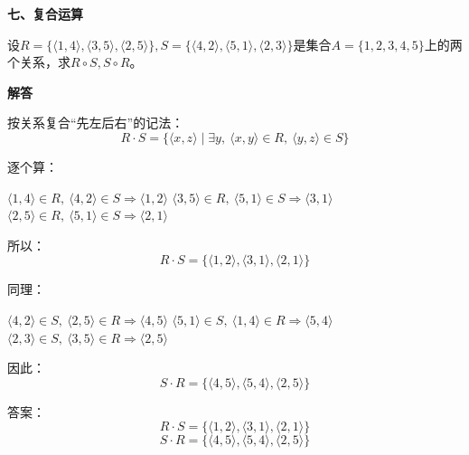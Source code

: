 \noindent\textbf{七、复合运算}

设$
R = \{\langle 1,4\rangle,\langle 3,5\rangle,\langle 2,5\rangle\},S = \{\langle 4,2\rangle,\langle 5,1\rangle,\langle 2,3\rangle\}$是集合$A=\{1,2,3,4,5\}$上的两个关系，求$R\circ S,S\circ R$。

\textbf{解答}

按关系复合“先左后右”的记法：
$$R\cdot S=\{\langle x,z\rangle \mid \exists y,\ \langle x,y\rangle\in R,\ \langle y,z\rangle\in S\}$$

逐个算：

$\langle1,4\rangle\in R,\ \langle4,2\rangle\in S \Rightarrow \langle1,2\rangle$
$\langle3,5\rangle\in R,\ \langle5,1\rangle\in S \Rightarrow \langle3,1\rangle$
$\langle2,5\rangle\in R,\ \langle5,1\rangle\in S \Rightarrow \langle2,1\rangle$

所以：
$$R\cdot S=\{\langle1,2\rangle,\langle3,1\rangle,\langle2,1\rangle\}$$

同理：

$\langle4,2\rangle\in S,\ \langle2,5\rangle\in R \Rightarrow \langle4,5\rangle$
$\langle5,1\rangle\in S,\ \langle1,4\rangle\in R \Rightarrow \langle5,4\rangle$
$\langle2,3\rangle\in S,\ \langle3,5\rangle\in R \Rightarrow \langle2,5\rangle$

因此：
$$S\cdot R=\{\langle4,5\rangle,\langle5,4\rangle,\langle2,5\rangle\}$$

答案：
$$\boxed{R\cdot S=\{\langle1,2\rangle,\langle3,1\rangle,\langle2,1\rangle\}}$$
$$\boxed{S\cdot R=\{\langle4,5\rangle,\langle5,4\rangle,\langle2,5\rangle\}}$$